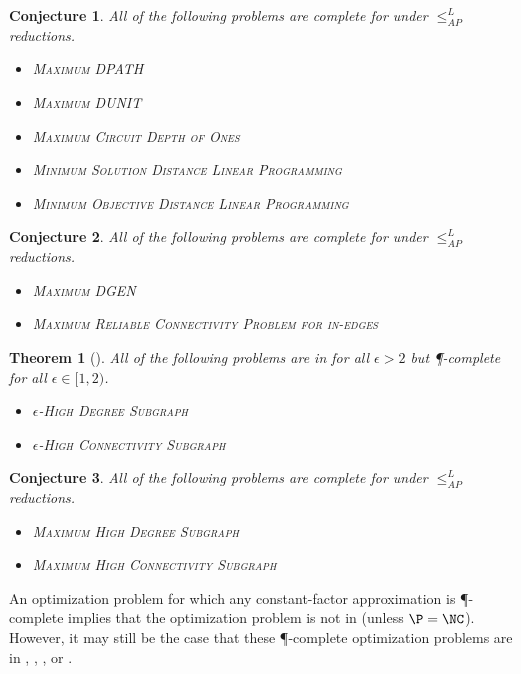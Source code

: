 \documentclass[]{article}
\theoremstyle{plain}
\newtheorem{conjecture}{Conjecture}
\newtheorem{theorem}{Theorem}
\theoremstyle{definition}
\newcommand{\APr}{\leq_{AP}^{L}}
\begin{document}
\begin{conjecture}
  All of the following problems are complete for \polyApxNCOp{} under $\APr$ reductions.
  \begin{itemize}
  \item \textsc{Maximum DPATH}
  \item \textsc{Maximum DUNIT}
  \item \textsc{Maximum Circuit Depth of Ones}
  \item \textsc{Minimum Solution Distance Linear Programming}
  \item \textsc{Minimum Objective Distance Linear Programming}
  \end{itemize}
\end{conjecture}

\begin{conjecture}
  All of the following problems are complete for \logApxNCOp{} under $\APr$ reductions.
  \begin{itemize}
  \item \textsc{Maximum DGEN}
  \item \textsc{Maximum Reliable Connectivity Problem for in-edges}
  \end{itemize}
\end{conjecture}

\begin{theorem}[{\cite[{Theorem~4 and Theorem~5}]{am84}}]
  All of the following problems are in \NC{} for all $\epsilon > 2$ but \P-complete for all $\epsilon \in [1, 2)$.
  \begin{itemize}
  \item \textsc{$\epsilon$-High Degree Subgraph} \cite[Theorem~4 and Theorem~5]{am84}
  \item \textsc{$\epsilon$-High Connectivity Subgraph} \cite[Theorem~6]{ss89}
  \end{itemize}
\end{theorem}

\begin{conjecture}
  All of the following problems are complete for \ApxNCOp{} under $\APr$ reductions.
  \begin{itemize}
  \item \textsc{Maximum High Degree Subgraph}
  \item \textsc{Maximum High Connectivity Subgraph}
  \end{itemize}
\end{conjecture}

An optimization problem for which any constant-factor approximation is \P-complete implies that the optimization problem is not in \ApxNCO{} (unless $\P=\NC$).
However, it may still be the case that these \P-complete optimization problems are in \logApxNCO, \polyApxNCO, \expApxNCO, or \NNCO.
\end{document}

